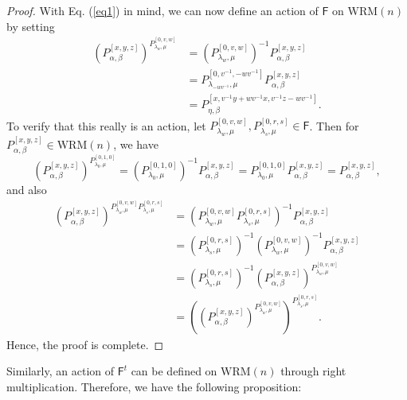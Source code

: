 \documentclass{amsart}
\begin{document}
\begin{proof}
With Eq. (\ref{eq1}) in mind, we can now define an action of $\mathsf {F}$ on $\mathrm{WRM}(n)$ by setting 
\begin{align*}(P_{\alpha, \beta}^{[x, y, z]})^{P_{\lambda_w, \mu}^{[0, v, w]}}&=(P_{\lambda_w, \mu}^{[0, v, w]})^{-1} P_{\alpha, \beta}^{[x, y, z]}\\
&=P_{\lambda_{-wv^{-1}}, \mu}^{[0, v^{-1}, -wv^{-1}]} P_{\alpha, \beta}^{[x, y, z]}\\ &=P^{[x,  v^{-1}y+wv^{-1}x, v^{-1}z-wv^{-1}]}_{\eta, \beta}.\end{align*}
To verify that this really is an action, let $P_{\lambda_w, \mu}^{[0, v, w]}, P_{\lambda_s, \mu}^{[0, r, s]}\in \mathsf {F}$. Then for $P_{\alpha, \beta}^{[x, y, z]}\in \mathrm{WRM}(n)$, we have 
$$(P_{\alpha, \beta}^{[x, y, z]})^{P_{\lambda_{0}, {\mu}}^{[0, 1, 0]}}=(P_{\lambda_{0}, {\mu}}^{[0, 1, 0]} )^{-1}P_{\alpha, \beta}^{[x, y, z]}=P_{\lambda_{0}, {\mu}}^{[0, 1, 0]} P_{\alpha, \beta}^{[x, y, z]}=P^{[x,  y, z]}_{\alpha, \beta},$$ and also 
\begin{align*} (P_{\alpha, \beta}^{[x, y, z]})^{P_{\lambda_w, \mu}^{[0, v, w]}P_{\lambda_s, \mu}^{[0, r, s]}}&=(P_{\lambda_w, \mu}^{[0, v, w]}P_{\lambda_s, \mu}^{[0, r, s]})^{-1} P_{\alpha, \beta}^{[x, y, z]}\\ 
&=(P_{\lambda_s, \mu}^{[0, r, s]})^{-1}  (P_{\lambda_w, \mu}^{[0, v, w]})^{-1}P^{[x,  y, z]}_{\alpha, \beta}\\
&=(P_{\lambda_s, \mu}^{[0, r, s]})^{-1} (P_{\alpha, \beta}^{[x, y, z]})^{P_{\lambda_w, \mu}^{[0, v, w]}}\\
&=\left((P_{\alpha, \beta}^{[x, y, z]})^{P_{\lambda_w, \mu}^{[0, v, w]}}\right)^{P_{\lambda_s, \mu}^{[0, r, s]}}.
\end{align*}
Hence, the proof is complete. \end{proof}

Similarly, an action of $\mathsf {F}^t$ can be defined on $\mathrm{WRM}(n)$ through right multiplication. Therefore, we have the following proposition:
\end{document}
